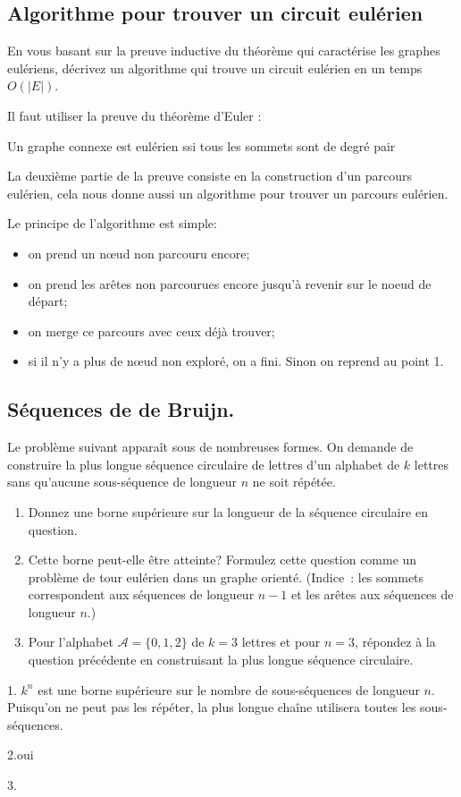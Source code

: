 \subsection{Algorithme pour trouver un circuit eulérien} En vous basant sur la preuve inductive du théorème qui caractérise les graphes eulériens, décrivez un algorithme qui trouve un circuit eulérien en un temps $O(|E|)$.
\begin{solution}
Il faut utiliser la preuve du théorème d'Euler :

\begin{center}
Un graphe connexe est eulérien ssi tous les sommets sont de degré
pair
\par\end{center}

La deuxième partie de la preuve consiste en la construction d'un parcours
eulérien, cela nous donne aussi un algorithme pour trouver un parcours
eulérien.

Le principe de l’algorithme est simple:
\begin{itemize}
\item on prend un nœud non parcouru encore;
\item on prend les arêtes non parcourues encore jusqu'à revenir sur le noeud de départ;
\item on merge ce parcours avec ceux déjà trouver;
\item si il n'y a plus de nœud non exploré, on a fini. Sinon on reprend au point 1.
\end{itemize}
\end{solution}
\subsection{Séquences de de Bruijn.} Le problème suivant apparaît sous de nombreuses formes. On demande de construire la plus longue séquence circulaire de lettres d'un alphabet de $k$ lettres sans qu'aucune sous-séquence de longueur $n$ ne soit répétée.
\begin{enumerate}
  \item Donnez une borne supérieure sur la longueur de la séquence circulaire en question.
  \item Cette borne peut-elle être atteinte? Formulez cette question comme un problème de tour eulérien dans un graphe orienté. (Indice~: les sommets correspondent aux séquences de longueur $n-1$ et les arêtes aux séquences de longueur $n$.)
  \item Pour l'alphabet $\mathcal{A} = \{0, 1, 2\}$ de $k = 3$ lettres et pour $n = 3$, répondez à la question précédente en construisant la plus longue séquence circulaire.
\end{enumerate}
\begin{solution}
1. $k^{n}$ est une borne supérieure sur le nombre de sous-séquences
de longueur $n$. Puisqu'on ne peut pas les répéter, la plus longue
chaîne utilisera toutes les sous-séquences.

2.oui

3.
\end{solution}
\pagebreak
